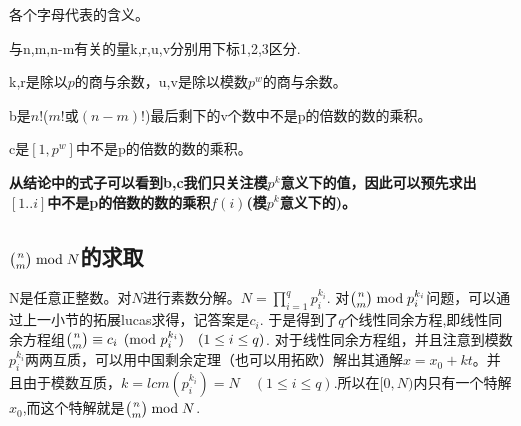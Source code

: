 \par 各个字母代表的含义。
\par 与n,m,n-m有关的量k,r,u,v分别用下标1,2,3区分.
\par k,r是除以$p$的商与余数，u,v是除以模数$p^w$的商与余数。
\par b是$n!$($m!$或$(n-m)!$)最后剩下的v个数中不是p的倍数的数的乘积。
\par c是$\left[1,p^w\right]$中不是p的倍数的数的乘积。
\par \textbf{从结论中的式子可以看到b,c我们只关注模$p^k$意义下的值，因此可以预先求出$[1..i]$中不是p的倍数的数的乘积$f(i)$(模$p^k$意义下的)。}
\subsection{$\tbinom{n}{m} \bmod N$的求取}
N是任意正整数。对$N$进行素数分解。$N=\prod\limits_{i=1}^{q}p_i^{k_i}$.
对$\tbinom{n}{m} \bmod p_i^{k_i}$问题，可以通过上一小节的拓展lucas求得，记答案是$c_i$.
于是得到了$q$个线性同余方程,即线性同余方程组$\tbinom{n}{m} \equiv c_i \pmod{p_i^{k_i}} \quad (1 \leq i \leq q)$.
对于线性同余方程组，并且注意到模数$p_i^{k_i}$两两互质，可以用中国剩余定理（也可以用拓欧）解出其通解$x=x_0+kt$。并且由于模数互质，$k=lcm(p_i^{k_i})=N \quad (1 \leq i \leq q)$.所以在$[0,N)$内只有一个特解$x_0$,而这个特解就是$\tbinom{n}{m} \bmod N$.

